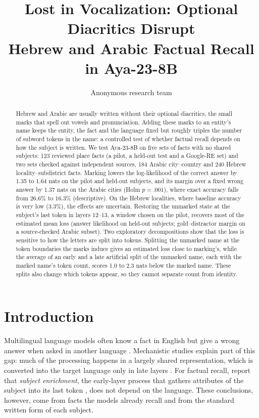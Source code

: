 \documentclass[11pt]{article}
\title{Lost in Vocalization: Optional Diacritics Disrupt\\Hebrew and Arabic Factual Recall in Aya-23-8B}
\author{Anonymous research team}
\begin{document}
\maketitle

\begin{abstract}
Hebrew and Arabic are usually written without their optional diacritics, the
small marks that spell out vowels and pronunciation. Adding these marks to an
entity's name keeps the entity, the fact and the language fixed but roughly
triples the number of subword tokens in the name: a controlled test of whether
factual recall depends on how the subject is written. We test
Aya-23-8B on five sets of facts with no shared subjects: 123 reviewed place facts
(a pilot, a held-out test and a Google-RE set) and two sets checked against
independent sources, 184 Arabic city--country and 240 Hebrew
locality--subdistrict facts. Marking lowers the log-likelihood of the correct
answer by 1.35 to 1.64 nats on the pilot and held-out subjects, and its margin
over a fixed wrong answer by 1.37 nats on the Arabic cities (Holm $p=.001$),
where exact accuracy falls from 26.6\% to 16.3\% (descriptive). On the Hebrew localities, where baseline accuracy is very low (3.3\%), the effects are uncertain.
Restoring the unmarked state at the subject's last token in layers 12--13,
a window chosen on the pilot, recovers most of the estimated mean loss (answer likelihood on held-out
subjects; gold--distractor margin on a source-checked Arabic subset). Two exploratory decompositions show that the loss is sensitive to how
the letters are split into tokens. Splitting the unmarked name at the token
boundaries the marks induce gives an estimated loss close to marking's, while the average of an early and a late artificial split of the unmarked
name, each with the marked name's token count, scores 1.0 to 2.3 nats below the
marked name. These splits also change which tokens
appear, so they cannot separate count from identity.
\end{abstract}

\section{Introduction}
\label{sec:intro}

Multilingual language models often know a fact in English but give a wrong
answer when asked in another language
\citep{jiang-etal-2020-x,kassner-etal-2021-multilingual,qi-etal-2023-cross}.
Mechanistic studies explain part of this gap: much of the processing happens in a
largely shared representation, which is converted into the target language only
in late layers
\citep{wendler-etal-2024-llamas,dumas-etal-2025-separating,wang-etal-2025-lost-multilinguality}.
For factual recall, \citet{fierro-etal-2025-multilingual} report that
\emph{subject enrichment}, the early-layer process that gathers attributes of the
subject into its last token \citep{geva-etal-2023-dissecting}, does not depend on
the language. These conclusions, however, come from facts the models already
recall and from the standard written form of each subject.
\end{document}
